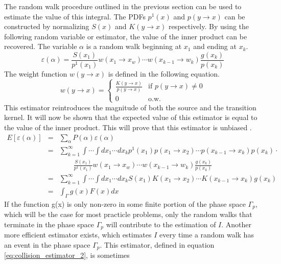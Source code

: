 The random walk procedure outlined in the previous section can be used to
estimate the value of this integral. The PDFs $p^1(x)$ and $p(y \to x)$ can be 
constructed by normalizing $S(x)$ and $K(y \to x)$ respectively. By using the
following random variable or estimator, the value of the inner product can 
be recovered. The variable $\alpha$ is a random walk beginning at $x_1$ and 
ending at $x_k$.
\begin{equation}
  \varepsilon(\alpha) = \frac{S(x_1)}{p^1(x_1)}w(x_1 \to x_w)\cdots 
  w(x_{k-1} \to w_k)\frac{g(x_k)}{p(x_k)}
  \label{eq:collision_estimator_1}
\end{equation}
The weight function $w(y \to x)$ is defined in the following equation.
\begin{equation}
  w(y \to x) = 
  \begin{cases}
    \frac{K(y \to x)}{p(y \to x)} & \text{if } p(y \to x) \neq 0 \\
    0 & \text{o.w.}
  \end{cases}
\end{equation}
This estimator reintroduces the magnitude of both the source and the transition
kernel. It will now be shown that the expected value of this estimator is 
equal to the value of the inner product. This will prove that this estimator is
unbiased \citep{spanier_monte_1969}.
\begin{eqnarray}
  E\left[\varepsilon(\alpha)\right] & = & \sum_{\alpha} 
  P(\alpha)\varepsilon(\alpha) \nonumber \\
  & = & \sum_{k=1}^{\infty} \int \cdots \int dx_1 \cdots dx_k p^1(x_1)
  p(x_1 \to x_2) \cdots p(x_{k-1} \to x_k)p(x_k) \cdot \nonumber \\
  & & \qquad \frac{S(x_1)}{p^1(x_1)}w(x_1 \to x_w)\cdots 
  w(x_{k-1} \to w_k)\frac{g(x_k)}{p(x_k)} \nonumber \\
  & = & \sum_{k=1}^{\infty} \int \cdots \int dx_1 \cdots dx_k S(x_1)K(x_1 \to x_2)
  \cdots K(x_{k-1} \to x_k)g(x_k) \nonumber \\
  & = & \int_{\Gamma} g(x)F(x)dx \nonumber  
\end{eqnarray}
If the function g(x) is only non-zero in some finite portion of the phase space
$\Gamma_p$, which will be the case for most practicle problems, only the random
walks that terminate in the phase space $\Gamma_p$ will contribute to the 
estimation of $I$. Another more efficient estimator exists, which estimates $I$
every time a random walk has an event in the phase space $\Gamma_p$. This 
estimator, defined in equation \ref{eq:collision_estimator_2}, is sometimes 
